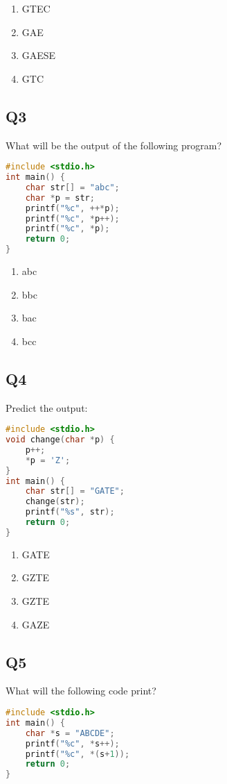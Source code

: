 \begin{enumerate}[label=(\alph*)]
    \item GTEC  
    \item GAE  
    \item GAESE  
    \item GTC
\end{enumerate}

\subsection*{Q3}
What will be the output of the following program?
\begin{lstlisting}[language=C]
#include <stdio.h>
int main() {
    char str[] = "abc";
    char *p = str;
    printf("%c", ++*p);
    printf("%c", *p++);
    printf("%c", *p);
    return 0;
}
\end{lstlisting}

\begin{enumerate}[label=(\alph*)]
    \item abc  
    \item bbc  
    \item bac  
    \item bcc
\end{enumerate}

\subsection*{Q4}
Predict the output:
\begin{lstlisting}[language=C]
#include <stdio.h>
void change(char *p) {
    p++;
    *p = 'Z';
}
int main() {
    char str[] = "GATE";
    change(str);
    printf("%s", str);
    return 0;
}
\end{lstlisting}

\begin{enumerate}[label=(\alph*)]
    \item GATE  
    \item GZTE  
    \item GZTE  
    \item GAZE
\end{enumerate}

\subsection*{Q5}
What will the following code print?
\begin{lstlisting}[language=C]
#include <stdio.h>
int main() {
    char *s = "ABCDE";
    printf("%c", *s++);
    printf("%c", *(s+1));
    return 0;
}
\end{lstlisting}

